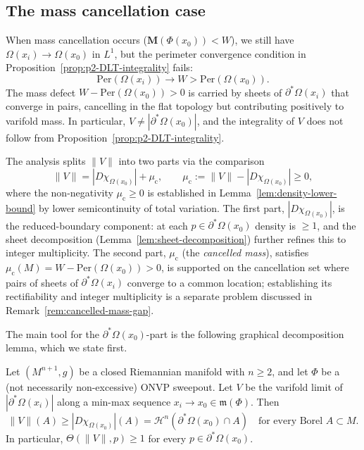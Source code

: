 \subsection{The mass cancellation case}\label{subsec:integrality-cancel}

When mass cancellation occurs ($\mathbf{M}(\Phi(x_0)) < W$), we still have $\Omega(x_i) \to \Omega(x_0)$ in $L^1$, but the perimeter convergence condition in Proposition~\ref{prop:p2-DLT-integrality} fails:
\[
    \mathrm{Per}(\Omega(x_i)) \to W > \mathrm{Per}(\Omega(x_0)).
\]
The mass defect $W - \mathrm{Per}(\Omega(x_0)) > 0$ is carried by sheets of $\partial^*\Omega(x_i)$ that converge in pairs, cancelling in the flat topology but contributing positively to varifold mass. In particular, $V \neq |\partial^*\Omega(x_0)|$, and the integrality of $V$ does not follow from Proposition~\ref{prop:p2-DLT-integrality}.

The analysis splits $\|V\|$ into two parts via the comparison
\begin{equation}\label{eq:V-vs-D-chi-decomp}
    \|V\| = |D\chi_{\Omega(x_0)}| + \mu_{\mathrm{c}}, \qquad \mu_{\mathrm{c}} := \|V\| - |D\chi_{\Omega(x_0)}| \geq 0,
\end{equation}
where the non-negativity $\mu_{\mathrm{c}} \geq 0$ is established in Lemma~\ref{lem:density-lower-bound} by lower semicontinuity of total variation. The first part, $|D\chi_{\Omega(x_0)}|$, is the reduced-boundary component: at each $p \in \partial^*\Omega(x_0)$ density is $\geq 1$, and the sheet decomposition (Lemma~\ref{lem:sheet-decomposition}) further refines this to integer multiplicity. The second part, $\mu_{\mathrm{c}}$ (the \emph{cancelled mass}), satisfies $\mu_{\mathrm{c}}(M) = W - \mathrm{Per}(\Omega(x_0)) > 0$, is supported on the cancellation set where pairs of sheets of $\partial^*\Omega(x_i)$ converge to a common location; establishing its rectifiability and integer multiplicity is a separate problem discussed in Remark~\ref{rem:cancelled-mass-gap}.

The main tool for the $\partial^*\Omega(x_0)$-part is the following graphical decomposition lemma, which we state first.


\begin{lemma}\label{lem:density-lower-bound}
Let $(M^{n+1}, g)$ be a closed Riemannian manifold with $n \geq 2$, and let $\Phi$ be a (not necessarily non-excessive) ONVP sweepout. Let $V$ be the varifold limit of $|\partial^*\Omega(x_i)|$ along a min-max sequence $x_i \to x_0 \in \mathfrak{m}(\Phi)$. Then
\begin{equation}\label{eq:V-dominates-DChi}
    \|V\|(A) \geq |D\chi_{\Omega(x_0)}|(A) = \mathcal{H}^n(\partial^*\Omega(x_0) \cap A)
    \quad \text{for every Borel } A \subset M.
\end{equation}
In particular, $\Theta(\|V\|, p) \geq 1$ for every $p \in \partial^*\Omega(x_0)$.
\end{lemma}

